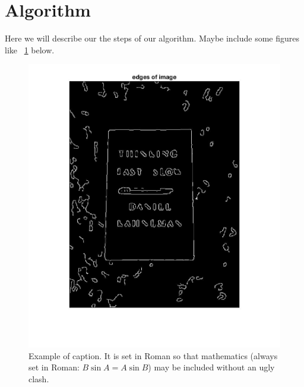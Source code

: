 \section{Algorithm}

Here we will describe our the steps of our algorithm.
Maybe include some figures like ~\ref{fig:onecol} below.

\begin{figure}[t]
\begin{center}
   \includegraphics[width=0.8\linewidth]{figures/edgeDetection.jpg}
\end{center}
   \caption{Example of caption.  It is set in Roman so that mathematics
   (always set in Roman: $B \sin A = A \sin B$) may be included without an
   ugly clash.}
\label{fig:long}
\label{fig:onecol}
\end{figure}
